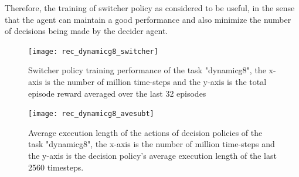 Therefore, the training of switcher policy as considered to be useful, in the sense that the agent can maintain a good performance and also minimize the number of decisions being made by the decider agent. 
\begin{figure}[!htbp]
	\centering
	\texttt{[image: rec\_dynamicg8\_switcher]}
	\caption{Switcher policy training performance of the task "dynamicg8", the x-axis is the number of million time-steps and the y-axis is the total episode reward averaged over the last 32 episodes}
	\label{fig:rec_dynamicg8_switcher}
\end{figure}

\begin{figure}[!htbp]
	\centering
	\texttt{[image: rec\_dynamicg8\_avesubt]}
	\caption{Average execution length of the actions of decision policies of the task "dynamicg8", the x-axis is the number of million time-steps and the y-axis is the decision policy's average execution length of the last 2560 timesteps.}
	\label{fig:rec_dynamicg8_avesubt}
\end{figure}